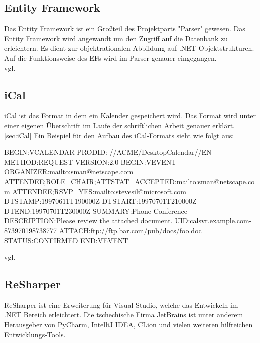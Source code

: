 \subsection {Entity Framework}
\label{sec:ef}
Das Entity Framework ist ein Großteil des Projektparts "Parser" gewesen. Das Entity Framework wird angewandt um den Zugriff auf die Datenbank zu erleichtern. Es dient zur objektrationalen Abbildung auf .NET Objektstrukturen. Auf die Funktionsweise des EFs wird im Parser genauer eingegangen. \\vgl. \cite{entityframework}
\subsection {iCal}
\label{sec:ical}
iCal ist das Format in dem ein Kalender gespeichert wird. Das Format wird unter einer eigenen Überschrift im Laufe der schriftlichen Arbeit genauer erklärt. \ref{sec:iCal}
Ein Beispiel für den Aufbau des iCal-Formats sieht wie folgt aus: 
\begin{flushleft}
BEGIN:VCALENDAR \break
   PRODID:-//ACME/DesktopCalendar//EN \break
   METHOD:REQUEST \break
   VERSION:2.0 \break
   BEGIN:VEVENT \break
   ORGANIZER:mailto:sman@netscape.com \break
   ATTENDEE;ROLE=CHAIR;ATTSTAT=ACCEPTED:mailto:sman@netscape.com \break
   ATTENDEE;RSVP=YES:mailto:stevesil@microsoft.com \break
   DTSTAMP:19970611T190000Z \break
   DTSTART:19970701T210000Z \break
   DTEND:19970701T230000Z \break
   SUMMARY:Phone Conference \break
   DESCRIPTION:Please review the attached document. \break
   UID:calsvr.example.com-873970198738777 \break
   ATTACH:ftp://ftp.bar.com/pub/docs/foo.doc \break
   STATUS:CONFIRMED \break
   END:VEVENT
\end{flushleft} \break vgl. \cite{TechnologieiCalExample}
\subsection {ReSharper}
\label{sec:ReSharper}
ReSharper ist eine Erweiterung für Visual Studio, welche das Entwickeln im .NET Bereich erleichtert. Die tschechische Firma JetBrains ist unter anderem Herausgeber von PyCharm, IntelliJ IDEA,  CLion und vielen weiteren hilfreichen Entwicklungs-Tools. 
